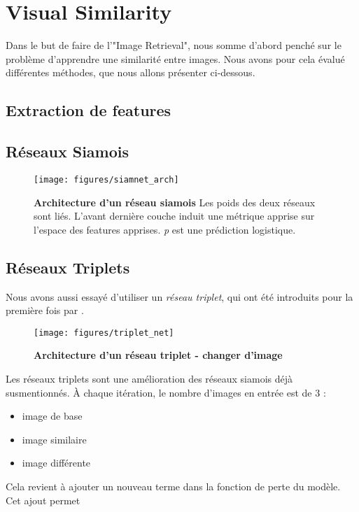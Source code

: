 \section{Visual Similarity}

Dans le but de faire de l'"Image Retrieval", nous somme d'abord pench\'e sur le probl\`eme d'apprendre une similarit\'e
entre images. Nous avons pour cela \'evalu\'e diff\'erentes m\'ethodes, que nous allons pr\'esenter ci-dessous.

\subsection{Extraction de features}

\subsection{R\'eseaux Siamois}
 
\begin{figure}[ht]
 \center
 \texttt{[image: figures/siamnet\_arch]}
 \caption{\label{siamnet_arch} \textbf{Architecture d'un r\'eseau siamois} Les poids des deux r\'eseaux sont li\'es. L'avant derni\`ere
    couche induit une m\'etrique apprise sur l'espace des features apprises. \textit{p} est une pr\'ediction logistique.
    \cite{koch2015siamese}}
\end{figure}

\subsection{R\'eseaux Triplets}

Nous avons aussi essayé d'utiliser un \textit{réseau triplet}, qui ont été introduits pour la première fois par
\cite{hoffer2014deep}.

\begin{figure}[ht]
    \center
    \texttt{[image: figures/triplet\_net]}
    \caption{\label{siamnet_arch} \textbf{Architecture d'un réseau triplet - changer d'image}
    \cite{hoffer2014deep}}
\end{figure}

Les réseaux triplets sont une amélioration des réseaux siamois déjà susmentionnés. À chaque itération, le nombre
d'images en entrée est de 3 : 

\begin{itemize}
    \item image de base
    \item image similaire
    \item image différente
\end{itemize}

Cela revient à ajouter un nouveau terme dans la fonction de perte du modèle. Cet ajout permet 
